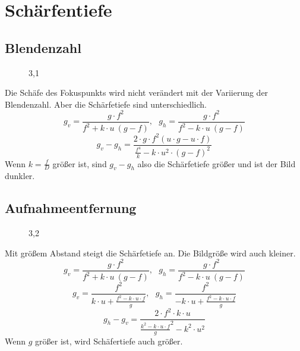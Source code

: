 \documentclass[12pt]{article}
\begin{document}
\newpage
\section{Schärfentiefe}
\subsection{Blendenzahl}
\begin{figure}[ht]\centering
	\caption{3,1}
\end{figure}
Die Schäfe des Fokuspunkts wird nicht verändert mit der Variierung der Blendenzahl. Aber die Schärfetiefe sind unterschiedlich. 
\begin{equation*}
g_{v}=\frac{g \cdot f^2}{f^2+k \cdot u\ (g-f)},\ \ \  g_{h}=\frac{g \cdot f^2}{f^2-k \cdot u\ (g-f)}
\end{equation*}
\begin{equation*}
g_{v}-g_{h}=\frac{2 \cdot g \cdot f^2 (u \cdot g - u \cdot f)}{\frac{f^4}{k} - k \cdot u^2 \cdot (g-f)^2}
\end{equation*}
Wenn $k=\frac{f}{D}$ größer ist, sind $g_{v} - g_{h}$ also die Schärfetiefe größer und ist der Bild dunkler.  
\newpage
\subsection{Aufnahmeentfernung}
\begin{figure}[ht]\centering
	\caption{3,2}
\end{figure}
Mit größem Abstand steigt die Schärfetiefe an. Die Bildgröße wird auch kleiner. 
\begin{equation*}
g_{v}=\frac{g \cdot f^2}{f^2+k \cdot u\ (g-f)},\ \ \  g_{h}=\frac{g \cdot f^2}{f^2-k \cdot u\ (g-f)}
\end{equation*}
\begin{equation*}
g_{v}=\frac{f^2}{k \cdot u + \frac{f^2-k \cdot u \cdot f}{g}},\ \ \  g_{h}=\frac{f^2}{-k \cdot u + \frac{f^2-k \cdot u \cdot f}{g}}
\end{equation*}
\begin{equation*}
g_{h}-g_{v}= \frac{2 \cdot f^2 \cdot k \cdot u}{{\frac{k^2-k \cdot u \cdot f}{g}}^2-k^2 \cdot u^2}
\end{equation*}
Wenn $g$ größer ist, wird Schäfertiefe auch größer. 
\newpage
\end{document}
